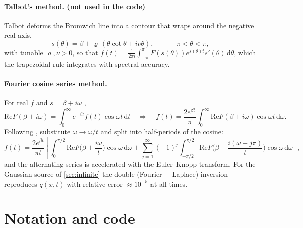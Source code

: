 \documentclass[11pt,a4paper]{article}
\numberwithin{equation}{section}
\theoremstyle{remark}
\newcommand{\dd}{\mathrm{d}}
\begin{document}
\paragraph{Talbot's method. (not used in the code)}
Talbot \cite{Talbot} deforms the Bromwich line into a contour that wraps around the negative real axis,
\begin{equation}
s(\theta)=\beta+\varrho\,(\theta\cot\theta+i\nu\theta),\qquad-\pi<\theta<\pi,
\end{equation}
with tunable $\varrho,\nu>0$, so that
$f(t)=\frac{1}{2\pi i}\int_{-\pi}^{\pi}F(s(\theta))e^{s(\theta)t}s'(\theta)\,\dd\theta$,
which the trapezoidal rule integrates with spectral accuracy.

\paragraph{Fourier cosine series method.}
For real $f$ and $s=\beta+i\omega$ \cite{LaplInverse},
\begin{equation}
\mathrm{Re}F(\beta+i\omega)=\int_0^\infty e^{-\beta t}f(t)\cos\omega t\,\dd t
\quad\Longrightarrow\quad
f(t)=\frac{2e^{\beta t}}{\pi}\int_0^\infty\mathrm{Re}F(\beta+i\omega)\cos\omega t\,\dd\omega .
\end{equation}
Following \cite{AnBenchmarks}, substitute $\omega\to\omega/t$ and split into half-periods of the cosine:
\begin{equation}
f(t)=\frac{2e^{\beta t}}{\pi t}\left[\int_0^{\pi/2}\mathrm{Re}F\Big(\beta+\frac{i\omega}{t}\Big)\cos\omega\,\dd\omega
+\sum_{j=1}^\infty(-1)^j\int_{-\pi/2}^{\pi/2}\mathrm{Re}F\Big(\beta+\frac{i(\omega+j\pi)}{t}\Big)\cos\omega\,\dd\omega\right],
\end{equation}
and the alternating series is accelerated with the Euler--Knopp transform. For the Gaussian source of \cref{sec:infinite} the double (Fourier + Laplace) inversion reproduces $q(x,t)$ with relative error $\approx10^{-5}$ at all times.

\section{Notation and code}
\label{app:code}
\end{document}
